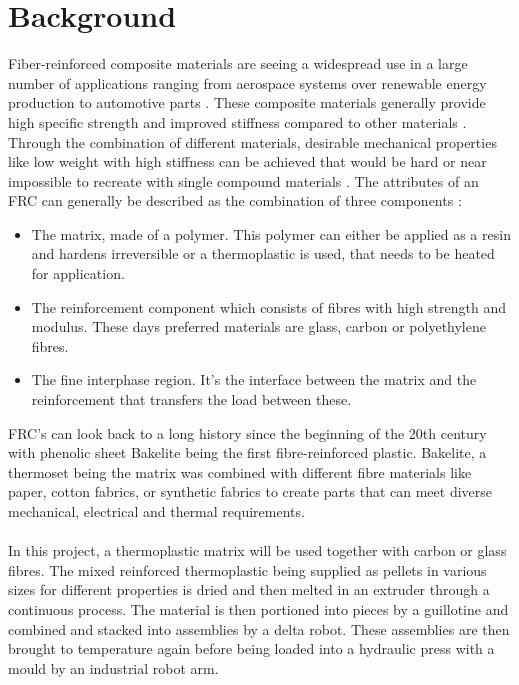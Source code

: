 
\chapter{Background}

Fiber-reinforced composite materials are seeing a widespread use in a large number of applications ranging from aerospace systems over renewable energy production to automotive parts \cite{park2011interface} \cite{HighPerformanceTextiles}. 
These composite materials generally provide high specific strength and improved stiffness compared to other materials \cite{GeneralizedContinuumMechanics}. 
Through the combination of different materials, desirable mechanical properties like low weight with high stiffness can be achieved that would be hard or near impossible to recreate with single compound materials \cite{AdvancesDamageMechanics}. 
The attributes of an FRC can generally be described as the combination of three components \cite{AdvancedDentalBiomaterials}: \\
\begin{itemize}
	\item The matrix, made of a polymer. 
	This polymer can either be applied as a resin and hardens irreversible or a thermoplastic is used, that needs to be heated for application.
	\item The reinforcement component which consists of fibres with high strength and modulus. 
	These days preferred materials are glass, carbon or polyethylene fibres.
	\item The fine interphase region. 
	It's the interface between the matrix and the reinforcement that transfers the load between these.	
\end{itemize}
%
FRC's can look back to a long history since the beginning of the 20th century with phenolic sheet Bakelite being the first fibre-reinforced plastic. 
Bakelite, a thermoset being the matrix was combined with different fibre materials like paper, cotton fabrics, or synthetic fabrics to create parts that can meet diverse mechanical, electrical and thermal requirements.
\cite{BakelitePhenolics}\\
\\
In this project, a thermoplastic matrix will be used together with carbon or glass fibres. 
The mixed reinforced thermoplastic being supplied as pellets in various sizes for different properties is dried and then melted in an extruder through a continuous process. 
The material is then portioned into pieces by a guillotine and combined and stacked into assemblies by a delta robot. 
These assemblies are then brought to temperature again before being loaded into a hydraulic press with a mould by an industrial robot arm.
\cite{SystemRequirements}







